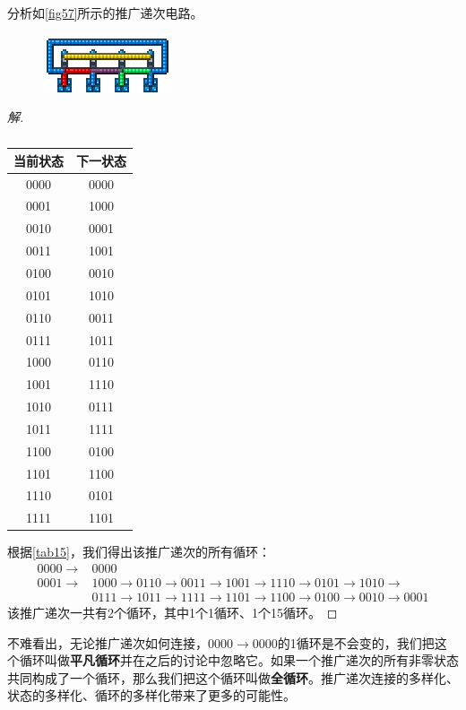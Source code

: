 \begin{example}
分析如\autoref{fig57}所示的推广递次电路。
\begin{figure}[!ht]
\centering
\includegraphics{images/426.png}
\caption{}\label{fig57}
\end{figure}
\end{example}
\begin{proof}[解]
\begin{table}[!ht]
\centering
\begin{tabular}{|c|c|}
\hline
当前状态&下一状态\\\hline
0000&0000\\\hline
0001&1000\\\hline
0010&0001\\\hline
0011&1001\\\hline
0100&0010\\\hline
0101&1010\\\hline
0110&0011\\\hline
0111&1011\\\hline
1000&0110\\\hline
1001&1110\\\hline
1010&0111\\\hline
1011&1111\\\hline
1100&0100\\\hline
1101&1100\\\hline
1110&0101\\\hline
1111&1101\\\hline
\end{tabular}
\caption{}\label{tab15}
\end{table}
根据\autoref{tab15}，我们得出该推广递次的所有循环：
\begin{align*}
0000\to &0000\\
0001\to &1000\to 0110\to 0011\to 1001\to 1110\to 0101\to 1010\to \\
        &0111\to 1011\to 1111\to 1101\to 1100\to 0100\to 0010\to 0001
\end{align*}
该推广递次一共有2个循环，其中1个1循环、1个15循环。
\end{proof}

不难看出，无论推广递次如何连接，$0000\to 0000$的1循环是不会变的，我们把这个循环叫做\textbf{平凡循环}并在之后的讨论中忽略它。如果一个推广递次的所有非零状态共同构成了一个循环，那么我们把这个循环叫做\textbf{全循环}。推广递次连接的多样化、状态的多样化、循环的多样化带来了更多的可能性。

